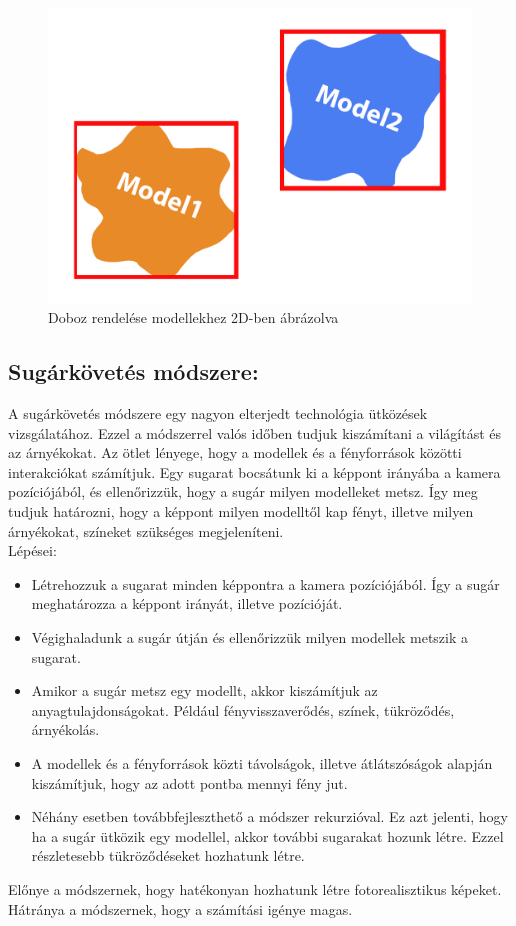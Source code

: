 \begin{figure}[h]
	\centering
	\includegraphics[width=13truecm, height=7.5truecm]{images/con1.png}
	\caption{Doboz rendelése modellekhez 2D-ben ábrázolva}
	\label{fig:con_1}
\end{figure}

\newpage

\subsection{Sugárkövetés módszere:}
A sugárkövetés módszere egy nagyon elterjedt technológia ütközések vizsgálatához. Ezzel a módszerrel valós időben tudjuk kiszámítani a világítást és az árnyékokat.
Az ötlet lényege, hogy a modellek és a fényforrások közötti interakciókat számítjuk. Egy sugarat bocsátunk ki a képpont irányába a kamera pozíciójából, és ellenőrizzük, hogy a sugár milyen modelleket metsz.
Így meg tudjuk határozni, hogy a képpont milyen modelltől kap fényt, illetve milyen árnyékokat, színeket szükséges megjeleníteni.
\\
Lépései:
\begin{itemize}
\item Létrehozzuk a sugarat minden képpontra a kamera pozíciójából. Így a sugár meghatározza a képpont irányát, illetve pozícióját.

\item Végighaladunk a sugár útján és ellenőrizzük milyen modellek metszik a sugarat.

\item Amikor a sugár metsz egy modellt, akkor kiszámítjuk az anyagtulajdonságokat. Például fényvisszaverődés, színek, tükröződés, árnyékolás.

\item A modellek és a fényforrások közti távolságok, illetve átlátszóságok alapján kiszámítjuk, hogy az adott pontba mennyi fény jut.

\item Néhány esetben továbbfejleszthető a módszer rekurzióval. Ez azt jelenti, hogy ha a sugár ütközik egy modellel, akkor további sugarakat hozunk létre. Ezzel részletesebb tükröződéseket hozhatunk létre.
\end{itemize}
Előnye a módszernek, hogy hatékonyan hozhatunk létre fotorealisztikus képeket.\\
Hátránya a módszernek, hogy a számítási igénye magas.

